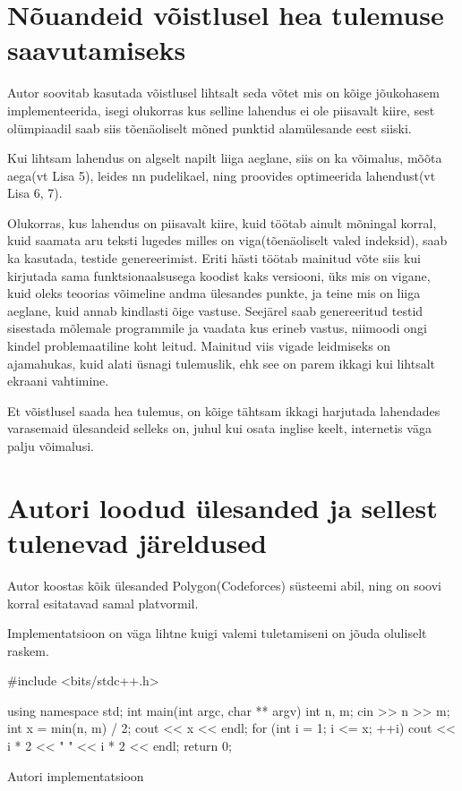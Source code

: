 \documentclass{trkut}
\begin{document}
\section{Nõuandeid võistlusel hea tulemuse saavutamiseks}
Autor soovitab kasutada võistlusel lihtsalt seda võtet mis on kõige jõukohasem implementeerida, isegi olukorras kus selline lahendus ei ole piisavalt kiire, sest olümpiaadil saab siis tõenäoliselt mõned punktid alamülesande eest siiski.

Kui lihtsam lahendus on algselt napilt liiga aeglane, siis on ka võimalus, mõõta aega(vt Lisa 5), leides nn pudelikael, ning proovides optimeerida lahendust(vt Lisa 6, 7).

Olukorras, kus lahendus on piisavalt kiire, kuid töötab ainult mõningal korral, kuid saamata aru teksti lugedes milles on viga(tõenäoliselt valed indeksid), saab ka kasutada, testide genereerimist. Eriti hästi töötab mainitud võte siis kui kirjutada sama funktsionaalsusega koodist kaks versiooni, üks mis on vigane, kuid oleks teoorias võimeline andma ülesandes punkte, ja teine mis on liiga aeglane, kuid annab kindlasti õige vastuse. Seejärel saab genereeritud testid sisestada mõlemale programmile ja vaadata kus erineb vastus, niimoodi ongi kindel problemaatiline koht leitud.
Mainitud viis vigade leidmiseks on ajamahukas, kuid alati üsnagi tulemuslik, ehk see on parem ikkagi kui lihtsalt ekraani vahtimine.

Et võistlusel saada hea tulemus, on kõige tähtsam ikkagi harjutada lahendades varasemaid ülesandeid selleks on, juhul kui osata inglise keelt, internetis väga palju võimalusi.
\section{Autori loodud ülesanded ja sellest tulenevad järeldused}

Autor koostas kõik ülesanded Polygon(Codeforces) süsteemi abil, ning on soovi korral esitatavad samal platvormil.




Implementatsioon on väga lihtne kuigi valemi tuletamiseni on jõuda oluliselt raskem.
    \begin{cclol}
 #include <bits/stdc++.h>

 using namespace std;
 int main(int argc, char ** argv) {
   int n, m;
   cin >> n >> m;
   int x = min(n, m) / 2;
   cout << x << endl;
   for (int i = 1; i <= x; ++i) {
     cout << i * 2 << " " << i * 2 << endl;
   }
   return 0;
 }
    \end{cclol}
    \begin{kk}[H]%
    \caption{Autori implementatsioon}%
    \label{mkm}%
    \end{kk}
\end{document}
